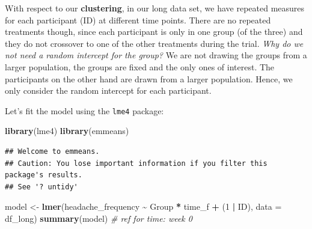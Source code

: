 \documentclass[
]{article}
\newenvironment{Shaded}{\begin{snugshade}}{\end{snugshade}}
\newcommand{\AttributeTok}[1]{\textcolor[rgb]{0.13,0.29,0.53}{#1}}
\newcommand{\CommentTok}[1]{\textcolor[rgb]{0.56,0.35,0.01}{\textit{#1}}}
\newcommand{\DecValTok}[1]{\textcolor[rgb]{0.00,0.00,0.81}{#1}}
\newcommand{\FunctionTok}[1]{\textcolor[rgb]{0.13,0.29,0.53}{\textbf{#1}}}
\newcommand{\NormalTok}[1]{#1}
\newcommand{\OtherTok}[1]{\textcolor[rgb]{0.56,0.35,0.01}{#1}}
\newcommand{\SpecialCharTok}[1]{\textcolor[rgb]{0.81,0.36,0.00}{\textbf{#1}}}
\begin{document}
With respect to our \textbf{clustering}, in our long data set, we have
repeated measures for each participant (ID) at different time points.
There are no repeated treatments though, since each participant is only
in one group (of the three) and they do not crossover to one of the
other treatments during the trial. \emph{Why do we not need a random
intercept for the group?} We are not drawing the groups from a larger
population, the groups are fixed and the only ones of interest. The
participants on the other hand are drawn from a larger population.
Hence, we only consider the random intercept for each participant.

Let's fit the model using the \texttt{lme4} package:

\begin{Shaded}
\begin{Highlighting}[]
\FunctionTok{library}\NormalTok{(lme4)}
\FunctionTok{library}\NormalTok{(emmeans)}
\end{Highlighting}
\end{Shaded}

\begin{verbatim}
## Welcome to emmeans.
## Caution: You lose important information if you filter this package's results.
## See '? untidy'
\end{verbatim}

\begin{Shaded}
\begin{Highlighting}[]
\NormalTok{model }\OtherTok{\textless{}{-}} \FunctionTok{lmer}\NormalTok{(headache\_frequency }\SpecialCharTok{\textasciitilde{}}\NormalTok{ Group }\SpecialCharTok{*}\NormalTok{ time\_f }\SpecialCharTok{+}\NormalTok{ (}\DecValTok{1} \SpecialCharTok{|}\NormalTok{ ID),}
              \AttributeTok{data =}\NormalTok{ df\_long)}
\FunctionTok{summary}\NormalTok{(model) }\CommentTok{\# ref for time: week 0}
\end{Highlighting}
\end{Shaded}
\end{document}
